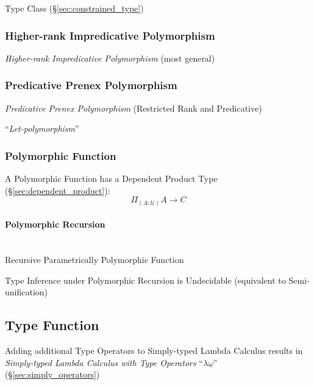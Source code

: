 Type Class (\S\ref{sec:constrained_type})



\subsubsection{Higher-rank Impredicative Polymorphism}
\label{sec:higherrank_impredicative}

\emph{Higher-rank Impredicative Polymorphism} (most general)



\subsubsection{Predicative Prenex Polymorphism}
\label{sec:predicative_prened}

\emph{Predicative Prenex Polymorphism} (Restricted Rank and
Predicative)

``\emph{Let-polymorphism}''



\subsubsection{Polymorphic Function}\label{sec:polymorphic_function}

A Polymorphic Function has a Dependent Product Type
(\S\ref{sec:dependent_product}):
\[
  \Pi_{(A:\mathcal{U})} A \rightarrow C
\]



\paragraph{Polymorphic Recursion}\label{sec:polymorphic_recursion}
\hfill \\

Recursive Parametrically Polymorphic Function

Type Inference under Polymorphic Recursion is Undecidable (equivalent
to Semi-unification) %



\subsection{Type Function}\label{sec:type_function}

Adding additional Type Operators to Simply-typed Lambda Calculus
results in \emph{Simply-typed Lambda Calculus with Type Operators}
``$\lambda \underline{\omega}$'' (\S\ref{sec:simply_operators})

